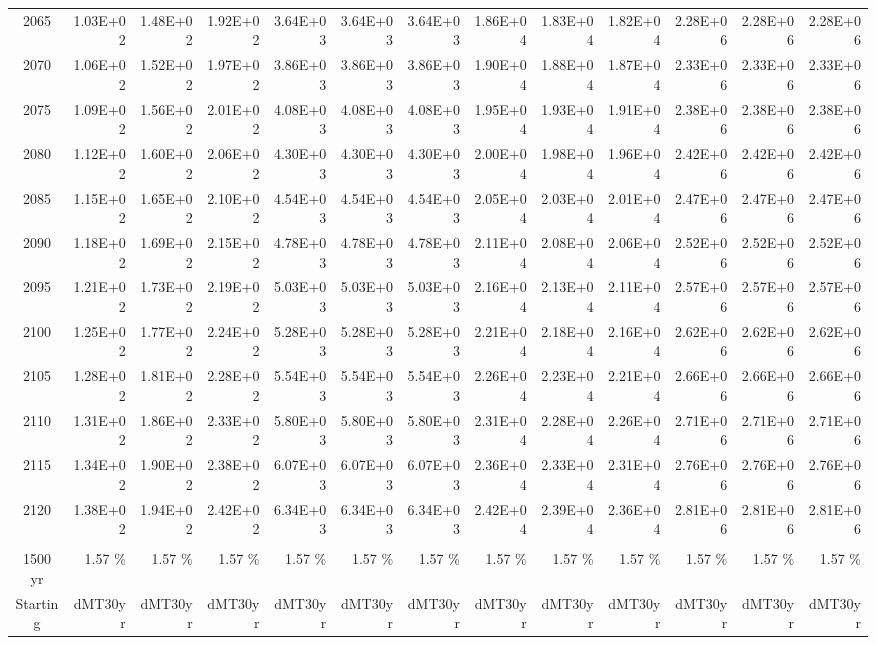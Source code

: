 \documentclass{article}
\begin{document}
\begin{table}
\begin{tabular}{crrr|rrr|rrr|rrr}
2065     & 1.03E+02 & 1.48E+02 & 1.92E+02 & 3.64E+03 & 3.64E+03 & 3.64E+03 & 1.86E+04 & 1.83E+04 & 1.82E+04 & 2.28E+06 & 2.28E+06 & 2.28E+06 \\
2070     & 1.06E+02 & 1.52E+02 & 1.97E+02 & 3.86E+03 & 3.86E+03 & 3.86E+03 & 1.90E+04 & 1.88E+04 & 1.87E+04 & 2.33E+06 & 2.33E+06 & 2.33E+06 \\
2075     & 1.09E+02 & 1.56E+02 & 2.01E+02 & 4.08E+03 & 4.08E+03 & 4.08E+03 & 1.95E+04 & 1.93E+04 & 1.91E+04 & 2.38E+06 & 2.38E+06 & 2.38E+06 \\
2080     & 1.12E+02 & 1.60E+02 & 2.06E+02 & 4.30E+03 & 4.30E+03 & 4.30E+03 & 2.00E+04 & 1.98E+04 & 1.96E+04 & 2.42E+06 & 2.42E+06 & 2.42E+06 \\
2085     & 1.15E+02 & 1.65E+02 & 2.10E+02 & 4.54E+03 & 4.54E+03 & 4.54E+03 & 2.05E+04 & 2.03E+04 & 2.01E+04 & 2.47E+06 & 2.47E+06 & 2.47E+06 \\
2090     & 1.18E+02 & 1.69E+02 & 2.15E+02 & 4.78E+03 & 4.78E+03 & 4.78E+03 & 2.11E+04 & 2.08E+04 & 2.06E+04 & 2.52E+06 & 2.52E+06 & 2.52E+06 \\
2095     & 1.21E+02 & 1.73E+02 & 2.19E+02 & 5.03E+03 & 5.03E+03 & 5.03E+03 & 2.16E+04 & 2.13E+04 & 2.11E+04 & 2.57E+06 & 2.57E+06 & 2.57E+06 \\
2100     & 1.25E+02 & 1.77E+02 & 2.24E+02 & 5.28E+03 & 5.28E+03 & 5.28E+03 & 2.21E+04 & 2.18E+04 & 2.16E+04 & 2.62E+06 & 2.62E+06 & 2.62E+06 \\
2105     & 1.28E+02 & 1.81E+02 & 2.28E+02 & 5.54E+03 & 5.54E+03 & 5.54E+03 & 2.26E+04 & 2.23E+04 & 2.21E+04 & 2.66E+06 & 2.66E+06 & 2.66E+06 \\
2110     & 1.31E+02 & 1.86E+02 & 2.33E+02 & 5.80E+03 & 5.80E+03 & 5.80E+03 & 2.31E+04 & 2.28E+04 & 2.26E+04 & 2.71E+06 & 2.71E+06 & 2.71E+06 \\
2115     & 1.34E+02 & 1.90E+02 & 2.38E+02 & 6.07E+03 & 6.07E+03 & 6.07E+03 & 2.36E+04 & 2.33E+04 & 2.31E+04 & 2.76E+06 & 2.76E+06 & 2.76E+06 \\
2120     & 1.38E+02 & 1.94E+02 & 2.42E+02 & 6.34E+03 & 6.34E+03 & 6.34E+03 & 2.42E+04 & 2.39E+04 & 2.36E+04 & 2.81E+06 & 2.81E+06 & 2.81E+06 \\
         &          &          &          &          &          &          &          &          &          &          &          &          \\
1500 yr  & 1.57 \%  & 1.57 \%  & 1.57 \%  & 1.57 \%  & 1.57 \%  & 1.57 \%  & 1.57 \%  & 1.57 \%  & 1.57 \%  & 1.57 \%  & 1.57 \%  & 1.57 \%  \\
Starting & dMT30yr  & dMT30yr  & dMT30yr  & dMT30yr  & dMT30yr  & dMT30yr  & dMT30yr  & dMT30yr  & dMT30yr  & dMT30yr  & dMT30yr  & dMT30yr  \\

\end{tabular}
\end{table}
\end{document}
